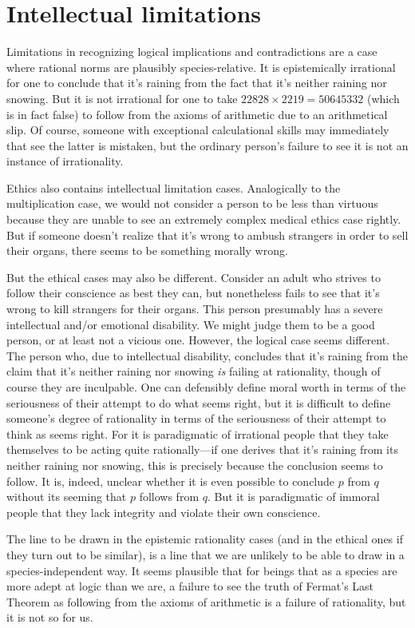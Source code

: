 \section{Intellectual limitations}
Limitations in recognizing logical implications and contradictions are a case where rational norms are plausibly
species-relative. It is epistemically irrational for one to conclude that it's raining from the fact that it's neither 
raining nor snowing. But it is not irrational for one to take $22828 \times 2219 = 50645332$ (which is in fact
false) to follow from the axioms of arithmetic due to an arithmetical slip. Of course, someone with 
exceptional calculational skills may immediately that see the latter is mistaken, but the ordinary person's failure to see it is 
not an instance of irrationality. 

Ethics also contains intellectual limitation cases. Analogically to the multiplication
case, we would not consider a person to be less than virtuous because they are unable to see an extremely complex medical 
ethics case rightly. But if someone doesn't realize that it's wrong to ambush strangers in order to sell their organs,
there seems to be something morally wrong.

But the ethical cases may also be different. Consider an adult who strives to follow their conscience as best they can,
but nonetheless fails to see that it's wrong to kill strangers for their organs. This person presumably has
a severe intellectual and/or emotional disability. We might judge them to be a good person, or at least not a vicious one. 
However, the logical case seems different. The person who, due to intellectual disability, concludes that it's raining 
from the claim that it's neither raining nor snowing \textit{is} failing at rationality, though of course they are 
inculpable. One can defensibly define moral worth in terms of the seriousness of their attempt to do what seems right, but
it is difficult to define someone's degree of rationality in terms of the seriousness of their attempt to think as seems
right. For it is paradigmatic of irrational people that they take themselves to be acting quite rationally---if one
derives that it's raining from its neither raining nor snowing, this is precisely because the conclusion seems to follow.
It is, indeed, unclear whether it is even possible to conclude $p$ from $q$ without its seeming that $p$ follows from $q$.
But it is paradigmatic of immoral people that they lack integrity and violate their own conscience. 

The line to be drawn in the epistemic rationality cases (and in the ethical ones if they turn out to be similar), is a line that we 
are unlikely to be able to draw in a species-independent way. It seems plausible that for beings that as a species are 
more adept at logic than we are, a failure to see the truth of Fermat's Last Theorem as following from the axioms of
arithmetic is a failure of rationality, but it is not so for us. 


